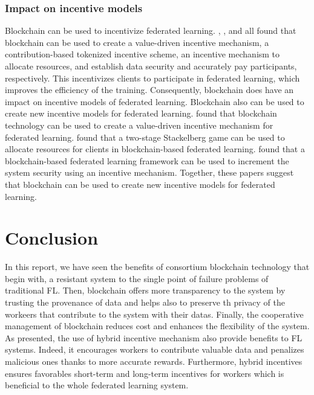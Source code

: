 \documentclass{article}
\begin{document}
\subsubsection{Impact on incentive models}
Blockchain can be used to incentivize federated learning. \cite{kumar_2020}, \cite{pandey_2022}, \cite{wang_2022} and \cite{martinez_record_2019} all found that blockchain can be used to create a value-driven incentive mechanism, a contribution-based tokenized incentive scheme, an incentive mechanism to allocate resources, and establish data security and accurately pay participants, respectively. This incentivizes clients to participate in federated learning, which improves the efficiency of the training. Consequently, blockchain does have an impact on incentive models of federated learning.\newline
Blockchain also can be used to create new incentive models for federated learning. \cite{kumar_2020} found that blockchain technology can be used to create a value-driven incentive mechanism for federated learning. \cite{wang_2022} found that a two-stage Stackelberg game can be used to allocate resources for clients in blockchain-based federated learning. \cite{goncalves_2022} found that a blockchain-based federated learning framework can be used to increment the system security using an incentive mechanism. Together, these papers suggest that blockchain can be used to create new incentive models for federated learning.




\section{Conclusion}
In this report, we have seen the benefits of consortium blockchain technology that begin with, a resistant system to the single point of failure problems of traditional FL. Then, blockchain offers more transparency to the system by trusting the provenance of data and helps also to preserve th privacy of the workeers that contribute to the system with their datas. Finally, the cooperative management of blockchain reduces cost and enhances the flexibility of the system. As presented, the use of hybrid incentive mechanism also provide benefits to FL systems. Indeed, it encourages workers to contribute valuable data and penalizes malicious ones thanks to more accurate rewards. Furthermore, hybrid incentives ensures favorables short-term and long-term incentives for workers which is beneficial to the whole federated learning system.
\end{document}

